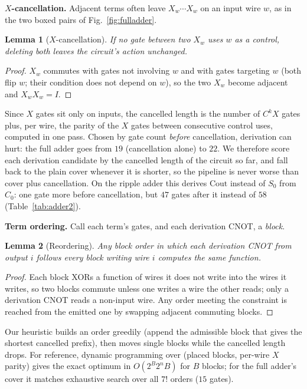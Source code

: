 \documentclass[conference]{IEEEtran}
\theoremstyle{plain}
\newtheorem{lemma}{Lemma}
\begin{document}
\textbf{$X$-cancellation.} Adjacent terms often leave $X_w\cdots X_w$ on
an input wire $w$, as in the two boxed pairs of Fig.~\ref{fig:fulladder}.
\begin{lemma}[$X$-cancellation]
\label{lem:xcancel}
If no gate between two $X_w$ uses $w$ as a control, deleting both leaves
the circuit's action unchanged.
\end{lemma}
\begin{proof}
$X_w$ commutes with gates not involving $w$ and with gates targeting
$w$ (both flip $w$; their condition does not depend on $w$), so the two
$X_w$ become adjacent and $X_wX_w=I$.
\end{proof}
Since $X$ gates sit only on inputs, the cancelled length is the number
of $C^kX$ gates plus, per wire, the parity of the $X$ gates between
consecutive control uses, computed in one pass. Chosen by gate count
\emph{before} cancellation, derivation can hurt: the full adder goes
from $19$ (cancellation alone) to $22$. We therefore score each
derivation candidate by the cancelled length of the circuit so far, and
fall back to the plain cover whenever it is shorter, so the pipeline is
never worse than cover plus cancellation. On the ripple adder this
derives $\mathrm{Cout}$ instead of $S_0$ from $C_0$: one gate more before
cancellation, but $47$ gates after it instead of $58$
(Table~\ref{tab:adder2}).

\textbf{Term ordering.} Call each term's gates, and each derivation CNOT,
a \emph{block}.
\begin{lemma}[Reordering]
\label{lem:reorder}
Any block order in which each derivation CNOT from output $i$ follows
every block writing wire $i$ computes the same function.
\end{lemma}
\begin{proof}
Each block XORs a function of wires it does not write into the wires it
writes, so two blocks commute unless one writes a wire the other reads;
only a derivation CNOT reads a non-input wire. Any order meeting the
constraint is reached from the emitted one by swapping adjacent
commuting blocks.
\end{proof}
Our heuristic builds an order greedily (append the admissible block that
gives the shortest cancelled prefix), then moves single blocks while the
cancelled length drops. For reference, dynamic programming over
(placed blocks, per-wire $X$ parity) gives the exact optimum in
$O(2^B2^nB)$ for $B$ blocks; for the full adder's cover it matches
exhaustive search over all $7!$ orders ($15$ gates).
\end{document}
